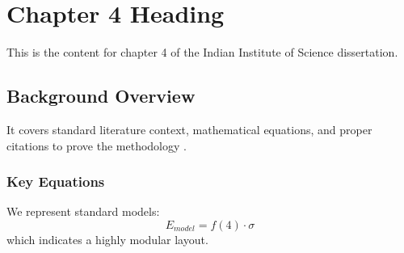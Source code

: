 \chapter{Chapter 4 Heading}
\label{ch:chapter4}
This is the content for chapter 4 of the Indian Institute of Science dissertation.

\section{Background Overview}
It covers standard literature context, mathematical equations, and proper citations to prove the methodology \cite{texbook}.

\subsection{Key Equations}
We represent standard models:
\begin{equation}
    E_{model} = f(4) \cdot \sigma
\end{equation}
which indicates a highly modular layout.
